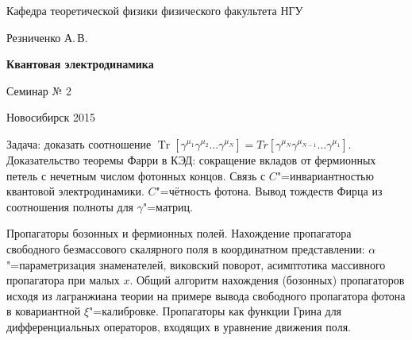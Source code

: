 \documentclass[12pt,pagesize,paper=landscape,paper=192mm:108mm]{scrbook}
\DeclareMathOperator{\Tr}{Tr}
\begin{document}
\begin{titlepage}
\begin{center}
    Кафедра теоретической физики физического факультета НГУ
    \medskip

    \Large
    Резниченко А.\,В.
    \bigskip

    \huge
    \textbf{Квантовая электродинамика}
    \bigskip

    \Large
    Семинар № 2
    \vfill

    \normalsize
    \vfill

    \normalsize \ccbysa\hspace{0.5em}  Новосибирск 2015
  \end{center}
\end{titlepage}
\newpage

\vspace*{-1em}
\begin{center}
\vfill
  \begin{minipage}{0.7\linewidth}

    Задача: доказать соотношение
    $\Tr[\gamma^{\mu_1}\gamma^{\mu_2}\ldots\gamma^{\mu_N}]=
    Tr[\gamma^{\mu_N}\gamma^{\mu_{N-1}}\ldots\gamma^{\mu_1}]$.
    Доказательство теоремы Фарри в КЭД: сокращение вкладов от
    фермионных петель с нечетным числом фотонных концов. Связь с
    $C$"=инвариантностью квантовой электродинамики. $C$"=чётность
    фотона.  Вывод тождеств Фирца из соотношения полноты для
    $\gamma$"=матриц.
    \smallskip

    Пропагаторы бозонных и фермионных полей.  Нахождение пропагатора
    свободного безмассового скалярного поля в координатном
    представлении: $\alpha$"=параметризация знаменателей, виковский
    поворот, асимптотика массивного пропагатора при малых $x$.  Общий
    алгоритм нахождения (бозонных) пропагаторов исходя из лагранжиана
    теории на примере вывода свободного пропагатора фотона в
    ковариантной $\xi$"=калибровке. Пропагаторы как функции Грина для
    дифференциальных операторов, входящих в уравнение движения поля.
  \end{minipage}
  \vfill

\end{center}
\end{document}

